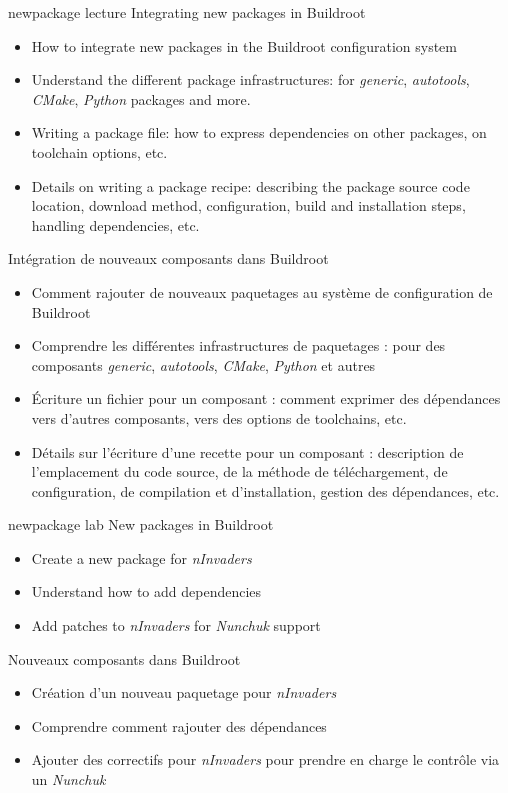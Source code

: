 {newpackage}
{lecture}
{Integrating new packages in Buildroot}
{
  \begin{itemize}
  \item How to integrate new packages in the Buildroot configuration
    system
  \item Understand the different package infrastructures: for {\em
      generic}, {\em autotools}, {\em CMake}, {\em Python} packages
    and more.
  \item Writing a package  file: how to express
    dependencies on other packages, on toolchain options, etc.
  \item Details on writing a package recipe: describing the package
    source code location, download method, configuration, build and
    installation steps, handling dependencies, etc.
  \end{itemize}
}
{Intégration de nouveaux composants dans Buildroot}
{
  \begin{itemize}
  \item Comment rajouter de nouveaux paquetages au système de
	configuration de Buildroot
  \item Comprendre les différentes infrastructures de paquetages : pour
	des composants {\em generic}, {\em autotools}, {\em CMake}, {\em
	Python} et autres
  \item Écriture un fichier  pour un composant : comment
    exprimer des dépendances vers d'autres composants, vers des options
    de toolchains, etc.
  \item Détails sur l'écriture d'une recette pour un composant :
	description de l'emplacement du code source, de la méthode de
	téléchargement, de configuration, de compilation et
	d'installation, gestion des dépendances, etc. 
  \end{itemize}
}
{newpackage}
{lab}
{New packages in Buildroot}
{
  \begin{itemize}
  \item Create a new package for {\em nInvaders}
  \item Understand how to add dependencies
  \item Add patches to {\em nInvaders} for {\em Nunchuk} support
  \end{itemize}
}
{Nouveaux composants dans Buildroot}
{
  \begin{itemize}
  \item Création d'un nouveau paquetage pour {\em nInvaders}
  \item Comprendre comment rajouter des dépendances
  \item Ajouter des correctifs pour {\em nInvaders} pour prendre en
	charge le contrôle via un {\em Nunchuk}
  \end{itemize}
}
